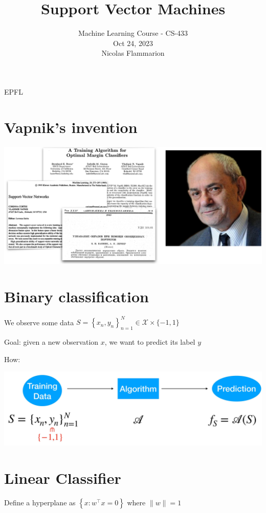 \documentclass[10pt]{article}
\title{Support Vector Machines }
\author{Machine Learning Course - CS-433\\
Oct 24, 2023\\
Nicolas Flammarion}
\date{}
\begin{document}
\maketitle
EPFL

\section*{Vapnik's invention}
\begin{center}
\includegraphics[max width=\textwidth]{2023_12_30_bf5d191916c1e78fa6d6g-02}
\end{center}

\section*{Binary classification}
We observe some data $S=\left\{x_{n}, y_{n}\right\}_{n=1}^{N} \in \mathscr{X} \times\{-1,1\}$

Goal: given a new observation $x$, we want to predict its label $y$

How:

\begin{center}
\includegraphics[max width=\textwidth]{2023_12_30_bf5d191916c1e78fa6d6g-03}
\end{center}

\section*{Linear Classifier}
Define a hyperplane as $\left\{x: w^{\top} x=0\right\}$ where $\|w\|=1$
\end{document}
